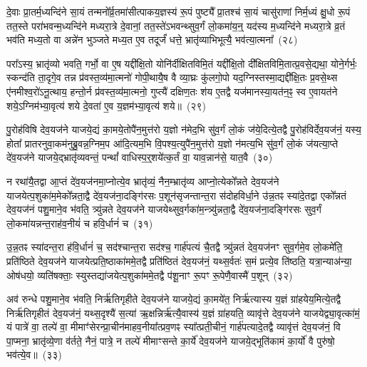 दे॒वाः प्रा॒तर्म॒ध्यन्दि॑ने सा॒यं तन्मनो᳚र्व्र॒तमा॑सीत्पाकय॒ज्ञस्य॑ रू॒पं पुष्ट्यै᳚ प्रा॒तश्च॑ सा॒यं चासु॑राणां निर्म॒ध्यं क्षु॒धो रू॒पं तत॒स्ते परा॑भवन्म॒ध्यन्दि॑ने मध्यरा॒त्रे दे॒वानां॒ तत॒स्ते॑\-ऽभवन्थ्सुव॒र्गं लो॒कमा॑य॒न्॒ यद॑स्य म॒ध्यन्दि॑ने मध्यरा॒त्रे व्र॒तं भव॑ति मध्य॒तो वा अन्ने॑न भुञ्जते मध्य॒त ए॒व तदूर्जं॑ धत्ते॒ भ्रातृ॑व्याभिभूत्यै॒ भव॑त्या॒त्मना᳚~(२८)




परा᳚\-ऽस्य॒ भ्रातृ॑व्यो भवति॒ गर्भो॒ वा ए॒ष यद्दी᳚क्षि॒तो योनि॑र्दीक्षितविमि॒तं यद्दी᳚क्षि॒तो दी᳚क्षितविमि॒तात्प्र॒वसे॒द्यथा॒ योने॒र्गर्भः॒ स्कन्द॑ति ता॒दृगे॒व तन्न प्र॑वस्त॒व्य॑मा॒त्मनो॑ गोपी॒थायै॒ष वै व्या॒घ्रः कु॑लगो॒पो यद॒ग्निस्तस्मा॒द्यद्दी᳚क्षि॒तः प्र॒वसे॒थ्स ए॑नमीश्व॒रो॑\-ऽनू॒त्थाय॒ हन्तो॒र्न प्र॑वस्त॒व्य॑मा॒त्मनो॒ गुप्त्यै॑ दक्षिण॒तः श॑य ए॒तद्वै यज॑मानस्या॒यत॑न॒ꣴ॒ स्व ए॒वायत॑ने शये॒\-ऽग्निम॑भ्या॒वृत्य॑ शये दे॒वता॑ ए॒व य॒ज्ञम॑भ्या॒वृत्य॑ शये॥~(२९)

{\anuvakamend[{ए॒तद्वै क्रू॒र इ॒वैक॑व्रता आ॒त्मना॒ यज॑मानस्य॒ त्रयो॑दश च}]}%

पु॒रोह॑विषि देव॒यज॑ने याजये॒द्यं का॒मये॒तोपै॑न॒मुत्त॑रो य॒ज्ञो न॑मेद॒भि सु॑व॒र्गं लो॒कं ज॑ये॒दित्ये॒तद्वै पु॒रोह॑विर्देव॒यज॑नं॒ यस्य॒ होता᳚ प्रातरनुवा॒कम॑नुब्रु॒वन्न॒ग्निम॒प आ॑दि॒त्यम॒भि वि॒पश्य॒त्युपै॑न॒मुत्त॑रो य॒ज्ञो न॑मत्य॒भि सु॑व॒र्गं लो॒कं ज॑यत्या॒प्ते दे॑व॒यज॑ने याजये॒द्भ्रातृ॑व्यवन्तं॒ पन्थां᳚ वाधिस्प॒र्॒\mbox{}शये॑त्क॒र्तं वा॒ याव॒न्नान॑से॒ यात॒वै~(३०)

न रथा॑यै॒तद्वा आ॒प्तं दे॑व॒यज॑नमा॒प्नोत्ये॒व भ्रातृ॑व्यं॒ नैन॒म्भ्रातृ॑व्य आप्नो॒त्येको᳚न्नते देव॒यज॑ने याजयेत्प॒शुका॑म॒मेको᳚न्नता॒द्वै दे॑व॒यज॑ना॒दङ्गि॑रसः प॒शून॑सृजन्तान्त॒रा स॑दोहविर्धा॒ने उ॑न्न॒तꣴ स्या॑दे॒तद्वा एको᳚न्नतं देव॒यज॑नं पशु॒माने॒व भ॑वति॒ त्र्यु॑न्नते देव॒यज॑ने याजयेथ्सुव॒र्गका॑म॒न्त्र्यु॑न्नता॒द्वै दे॑व॒यज॑ना॒दङ्गि॑रसः सुव॒र्गं लो॒कमा॑यन्नन्त॒राह॑व॒नीयं॑ च हवि॒र्धानं॑ च~(३१)

उ॒न्न॒तꣴ स्या॑दन्त॒रा ह॑वि॒र्धानं॑ च॒ सद॑श्चान्त॒रा सद॑श्च॒ गार्\mbox{}ह॑पत्यं चै॒तद्वै त्र्यु॑न्नतं देव॒यज॑नꣳ सुव॒र्गमे॒व लो॒कमे॑ति॒ प्रति॑ष्ठिते देव॒यज॑ने याजयेत्प्रति॒ष्ठाका॑ममे॒तद्वै प्रति॑ष्ठितं देव॒यज॑नं॒ यथ्स॒र्वतः॑ स॒मं प्रत्ये॒व ति॑ष्ठति॒ यत्रा॒न्याअ॑न्या॒ ओष॑धयो॒ व्यति॑षक्ताः॒ स्युस्तद्या॑जयेत्प॒शुका॑ममे॒तद्वै प॑शू॒नाꣳ रू॒पꣳ रू॒पेणै॒वास्मै॑ प॒शून्~(३२)

अव॑ रुन्धे पशु॒माने॒व भ॑वति॒ निर्\mbox{}ऋ॑तिगृहीते देव॒यज॑ने याजये॒द्यं का॒मये॑त॒ निर्\mbox{}ऋ॑त्यास्य य॒ज्ञं ग्रा॑हयेय॒मित्ये॒तद्वै निर्\mbox{}ऋ॑तिगृहीतं देव॒यज॑नं॒ यथ्स॒दृश्यै॑ स॒त्या॑ ऋ॒क्षन्निर्\mbox{}ऋ॑त्यै॒वास्य॑ य॒ज्ञं ग्रा॑हयति॒ व्यावृ॑त्ते देव॒यज॑ने याजयेद्व्या॒वृत्का॑मं॒ यं पात्रे॑ वा॒ तल्पे॑ वा॒ मीमाꣳ॑सेरन्प्रा॒चीन॑माहव॒नीया᳚त्प्रव॒णꣴ स्या᳚त्प्रती॒चीनं॒ गार्\mbox{}ह॑पत्यादे॒तद्वै व्यावृ॑त्तं देव॒यज॑नं॒ वि पा॒प्मना॒ भ्रातृ॑व्ये॒णा व॑र्तते॒ नैनं॒ पात्रे॒ न तल्पे॑ मीमाꣳसन्ते का॒र्ये॑ देव॒यज॑ने याजये॒द्भूति॑कामं का॒र्यो॑ वै पुरु॑षो॒ भव॑त्ये॒व॥~(३३)

